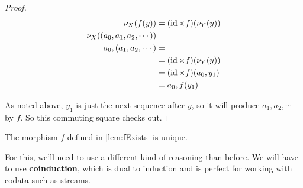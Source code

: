 \begin{proof}
\begin{align*}
    \nu_X (f(y)) &= (\operatorname{id} \times f) ( \nu_Y (y)) \\
    \nu_X ((a_0, a_1, a_2, \cdots)) &= \\
    a_0, (a_1, a_2, \cdots) &= \\
    &= (\operatorname{id} \times f) ( \nu_Y (y)) \\
    &= (\operatorname{id} \times f) (a_0, y_1) \\
    &= a_0, f(y_1) \\
\end{align*}

As noted above, $y_1$ is just the next sequence after $y$, so it will produce $a_1, a_2, \cdots$ by $f$.
So this commuting square checks out.
\end{proof}

\begin{lemma}
    \label{lem:fUnique}
The morphism $f$ defined in \cref{lem:fExists} is unique.
\end{lemma}

For this, we'll need to use a different kind of reasoning than before.
We will have to use \textbf{coinduction}, which is dual to induction and is perfect for working with codata such as streams.

